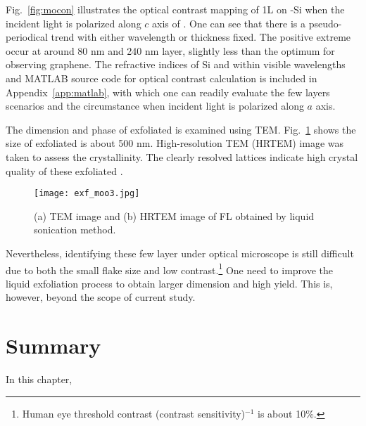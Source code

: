 Fig.~\ref{fig:mocon} illustrates the optical contrast mapping of 1L  on -Si when the incident light is polarized along $c$ axis of . One can see that there is a pseudo-periodical trend with either wavelength or  thickness fixed. The positive extreme occur at around 80 nm and 240 nm  layer, slightly less than the optimum for observing graphene. The refractive indices of Si and  within visible wavelengths and MATLAB source code for optical contrast calculation is included in Appendix~\ref{app:matlab}, with which one can readily evaluate the few layers  scenarios and the circumstance when incident light is polarized along $a$ axis.

The dimension and phase of exfoliated  is examined using TEM. Fig.~\ref{fig:motem} shows the size of exfoliated  is about 500 nm. High-resolution TEM (HRTEM) image was taken to assess the  crystallinity. The clearly resolved lattices indicate high crystal quality of these exfoliated .
\begin{figure}[htb]
\centering
\texttt{[image: exf\_moo3.jpg]}
\caption[TEM images of exfoliated ]{(a) TEM image and (b) HRTEM image of FL  obtained by liquid sonication method.}
\label{fig:motem}
\end{figure}
Nevertheless, identifying these few layer  under optical microscope is still difficult due to both the small flake size and low contrast.\footnote{Human eye threshold contrast (contrast sensitivity)$^{-1}$ is about 10\%.} One need to improve the liquid exfoliation process to obtain larger dimension and high yield. This is, however, beyond the scope of current study.

\section{Summary}

In this chapter, 
